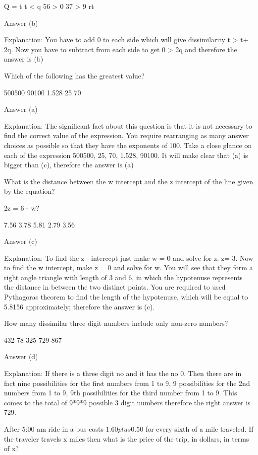         Q = t
        t < q
        56 > 0
        37 > 9
        rt 

    Answer (b)

    Explanation: You have to add 0 to each side which will give dissimilarity t > t+ 2q. Now you have to subtract from each side to get 0 > 2q and therefore the answer is (b)

    Which of the following has the greatest value?

        500500
        90100
        1.528
        25
        70 

    Answer (a)

    Explanation: The significant fact about this question is that it is not necessary to find the correct value of the expression. You require rearranging as many answer choices as possible so that they have the exponents of 100. Take a close glance on each of the expression 500500, 25, 70, 1.528, 90100. It will make clear that (a) is bigger than (c), therefore the answer is (a)

    What is the distance between the w intercept and the z intercept of the line given by the equation?

    2z = 6 - w?

        7.56
        3.78
        5.81
        2.79
        3.56 

    Answer (c)

    Explanation: To find the z - intercept just make w = 0 and solve for z. z= 3. Now to find the w intercept, make z = 0 and solve for w. You will see that they form a right angle triangle with length of 3 and 6, in which the hypotenuse represents the distance in between the two distinct points. You are required to used Pythagoras theorem to find the length of the hypotenuse, which will be equal to 5.8156 approximately; therefore the answer is (c).

    How many dissimilar three digit numbers include only non-zero numbers?

        432
        78
        325
        729
        867 

    Answer (d)

    Explanation: If there is a three digit no and it has the no 0. Then there are in fact nine possibilities for the first numbers from 1 to 9, 9 possibilities for the 2nd numbers from 1 to 9, 9th possibilities for the third number from 1 to 9. This comes to the total of 9*9*9 possible 3 digit numbers therefore the right answer is 729.

    After 5:00 am ride in a bus costs $1.60 plus $0.50 for every sixth of a mile traveled. If the traveler travels x miles then what is the price of the trip, in dollars, in terms of x?

